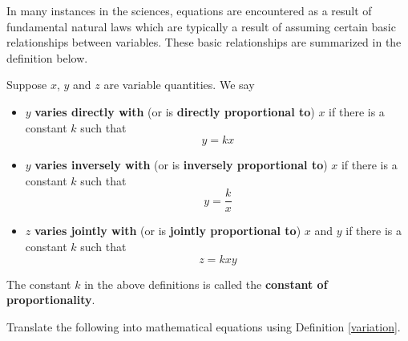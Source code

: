\documentclass{ximera}
\begin{document}
	\author{Stitz-Zeager}




\setcounter{footnote}{0}

\label{AppVariation}

In many instances in the sciences, equations are encountered as a result of fundamental natural laws which are typically a result of assuming certain basic relationships between variables.  These basic relationships are summarized in the definition below.

\smallskip

\colorbox{ResultColor}{\bbm

\begin{definition} \label{variation}  Suppose $x$, $y$ and $z$ are variable quantities.  We say

\begin{itemize}

\item  $y$ \textbf{varies directly with} (or is \textbf{directly proportional to}) $x$ if there is a constant $k$ such that \[y=kx\]

\item  $y$ \textbf{varies inversely with} (or is \textbf{inversely proportional to}) $x$ if there is a constant $k$ such that \[y=\frac{k}{x}\]

\item  $z$ \textbf{varies jointly with} (or is \textbf{jointly proportional to}) $x$ and $y$ if there is a constant $k$ such that \[z = kxy\]

\end{itemize}

The constant $k$ in the above definitions is called the \textbf{constant of proportionality}.

\end{definition}


\smallskip

\begin{example} \label{variationexample} Translate the following into mathematical equations using Definition \ref{variation}.

\begin{enumerate}


\end{enumerate}
\end{example}}
\end{document}
